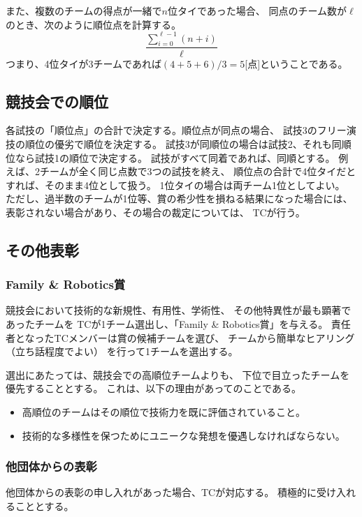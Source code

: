\documentclass[a4j]{jarticle}
\begin{document}
また、複数のチームの得点が一緒で$n$位タイであった場合、
同点のチーム数が$\ell$のとき、次のように順位点を計算する。
\[
	\dfrac{\sum_{i=0}^{\ell-1}(n + i)}{\ell}
\]
つまり、4位タイが3チームであれば$(4+5+6)/3=5$[点]ということである。


\subsection{競技会での順位}

各試技の「順位点」の合計で決定する。順位点が同点の場合、
試技3のフリー演技の順位の優劣で順位を決定する。
試技3が同順位の場合は試技2、それも同順位なら試技1の順位で決定する。
試技がすべて同着であれば、同順とする。
例えば、2チームが全く同じ点数で3つの試技を終え、
順位点の合計で4位タイだとすれば、そのまま4位として扱う。
1位タイの場合は両チーム1位としてよい。
ただし、過半数のチームが1位等、賞の希少性を損ねる結果になった場合には、
表彰されない場合があり、その場合の裁定については、
TCが行う。

\subsection{その他表彰}

\subsubsection{Family \& Robotics賞}

競技会において技術的な新規性、有用性、学術性、
その他特異性が最も顕著であったチームを
TCが1チーム選出し、「Family \& Robotics賞」を与える。
責任者となったTCメンバーは賞の候補チームを選び、
チームから簡単なヒアリング（立ち話程度でよい）
を行って1チームを選出する。

選出にあたっては、競技会での高順位チームよりも、
下位で目立ったチームを優先することとする。
これは、以下の理由があってのことである。
\begin{itemize}
	\item 高順位のチームはその順位で技術力を既に評価されていること。
	\item 技術的な多様性を保つためにユニークな発想を優遇しなければならない。
\end{itemize}

\subsubsection{他団体からの表彰}

他団体からの表彰の申し入れがあった場合、TCが対応する。
積極的に受け入れることとする。
\end{document}
